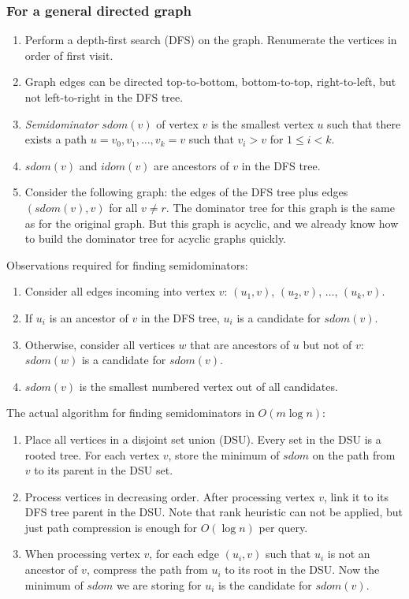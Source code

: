 \subsubsection*{For a general directed graph}
\begin{enumerate}
\item Perform a depth-first search (DFS) on the graph. Renumerate the vertices in order of first visit.
\item Graph edges can be directed top-to-bottom, bottom-to-top, right-to-left, but not left-to-right in the DFS tree.
\item \textit{Semidominator} $sdom(v)$ of vertex $v$ is the smallest vertex $u$ such that there exists a path $u = v_0, v_1, \ldots, v_k = v$ such that $v_i > v$ for $1 \le i < k$.
\item $sdom(v)$ and $idom(v)$ are ancestors of $v$ in the DFS tree.
\item Consider the following graph: the edges of the DFS tree plus edges $(sdom(v), v)$ for all $v \ne r$. The dominator tree for this graph is the same as for the original graph. But this graph is acyclic, and we already know how to build the dominator tree for acyclic graphs quickly.
\end{enumerate}
Observations required for finding semidominators:
\begin{enumerate}
\item Consider all edges incoming into vertex $v$: $(u_1, v)$, $(u_2, v)$, $\ldots$, $(u_k, v)$.
\item If $u_i$ is an ancestor of $v$ in the DFS tree, $u_i$ is a candidate for $sdom(v)$.
\item Otherwise, consider all vertices $w$ that are ancestors of $u$ but not of $v$: $sdom(w)$ is a candidate for $sdom(v)$.
\item $sdom(v)$ is the smallest numbered vertex out of all candidates.
\end{enumerate}
The actual algorithm for finding semidominators in $O(m \log n)$:
\begin{enumerate}
\item Place all vertices in a disjoint set union (DSU). Every set in the DSU is a rooted tree. For each vertex $v$, store the minimum of $sdom$ on the path from $v$ to its parent in the DSU set.
\item Process vertices in decreasing order. After processing vertex $v$, link it to its DFS tree parent in the DSU. Note that rank heuristic can not be applied, but just path compression is enough for $O(\log n)$ per query.
\item When processing vertex $v$, for each edge $(u_i, v)$ such that $u_i$ is not an ancestor of $v$, compress the path from $u_i$ to its root in the DSU. Now the minimum of $sdom$ we are storing for $u_i$ is the candidate for $sdom(v)$.
\end{enumerate}
